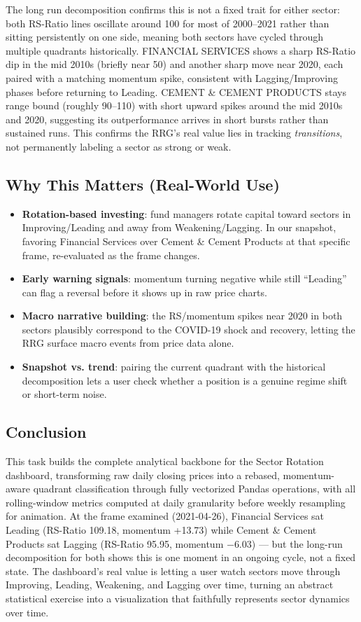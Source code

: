 \documentclass[14pt,a4paper]{extreport}
\begin{document}
The long run decomposition confirms this is not a fixed trait for either
sector: both RS-Ratio lines oscillate around 100 for most of 2000--2021
rather than sitting persistently on one side, meaning both sectors have
cycled through multiple quadrants historically. FINANCIAL SERVICES shows a
sharp RS-Ratio dip in the mid 2010s (briefly near 50) and another sharp
move near 2020, each paired with a matching momentum spike, consistent with
Lagging/Improving phases before returning to Leading. CEMENT \& CEMENT
PRODUCTS stays range bound (roughly 90--110) with short upward spikes
around the mid 2010s and 2020, suggesting its outperformance arrives in
short bursts rather than sustained runs. This confirms the RRG's real value
lies in tracking \textit{transitions}, not permanently labeling a sector as
strong or weak.

\subsection{Why This Matters (Real-World Use)}
\begin{itemize}
    \item \textbf{Rotation-based investing}: fund managers rotate capital
        toward sectors in Improving/Leading and away from
        Weakening/Lagging. In our snapshot, favoring Financial Services
        over Cement \& Cement Products at that specific frame, re-evaluated
        as the frame changes.
    \item \textbf{Early warning signals}: momentum turning negative while
        still ``Leading'' can flag a reversal before it shows up in raw
        price charts.
    \item \textbf{Macro narrative building}: the RS/momentum spikes near
        2020 in both sectors plausibly correspond to the COVID-19 shock and
        recovery, letting the RRG surface macro events from price data
        alone.
    \item \textbf{Snapshot vs. trend}: pairing the current quadrant with
        the historical decomposition lets a user check whether a position
        is a genuine regime shift or short-term noise.
\end{itemize}

\subsection{Conclusion}
This task builds the complete analytical backbone for the Sector Rotation
dashboard, transforming raw daily closing prices into a rebased,
momentum-aware quadrant classification through fully vectorized Pandas
operations, with all rolling-window metrics computed at daily granularity
before weekly resampling for animation. At the frame examined
(2021-04-26), Financial Services sat Leading (RS-Ratio 109.18, momentum
+13.73) while Cement \& Cement Products sat Lagging (RS-Ratio 95.95,
momentum $-6.03$) --- but the long-run decomposition for both shows this is
one moment in an ongoing cycle, not a fixed state. The dashboard's real
value is letting a user watch sectors move through Improving, Leading,
Weakening, and Lagging over time, turning an abstract statistical exercise
into a visualization that faithfully represents sector dynamics over time.
\end{document}
